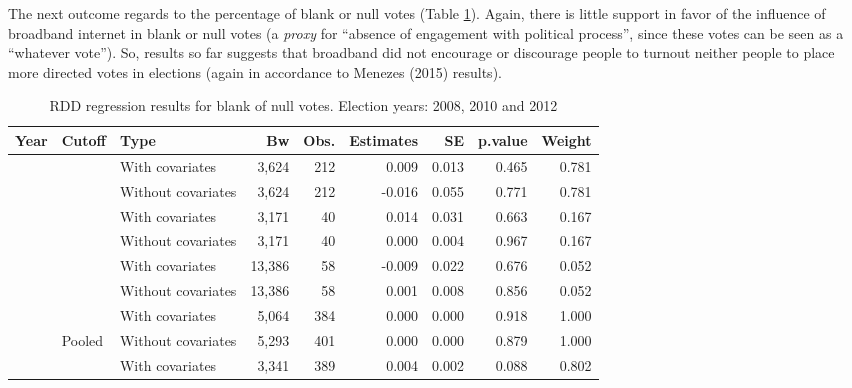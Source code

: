 \documentclass[
  12pt,
]{article}
\begin{document}
The next outcome regards to the percentage of blank or null votes (Table
\ref{tab:r.pct.bn}). Again, there is little support in favor of the
influence of broadband internet in blank or null votes (a \emph{proxy}
for ``absence of engagement with political process'', since these votes
can be seen as a ``whatever vote''). So, results so far suggests that
broadband did not encourage or discourage people to turnout neither
people to place more directed votes in elections (again in accordance to
Menezes (2015) results).

\begin{table}[H]

\caption{\label{tab:r.pct.bn}RDD regression results for blank of null votes. Election years: 2008, 2010 and 2012}
\centering
\begin{tabular}[t]{lllrrrrrr}
\toprule
Year & Cutoff & Type & Bw & Obs. & Estimates & SE & p.value & Weight\\
\midrule
 &  & With covariates & 3,624 & 212 & 0.009 & 0.013 & 0.465 & 0.781\\


 & \multirow{-2}{*}{\raggedright\arraybackslash 20000} & Without covariates & 3,624 & 212 & -0.016 & 0.055 & 0.771 & 0.781\\


 &  & With covariates & 3,171 & 40 & 0.014 & 0.031 & 0.663 & 0.167\\


 & \multirow{-2}{*}{\raggedright\arraybackslash 40000} & Without covariates & 3,171 & 40 & 0.000 & 0.004 & 0.967 & 0.167\\


 &  & With covariates & 13,386 & 58 & -0.009 & 0.022 & 0.676 & 0.052\\


 & \multirow{-2}{*}{\raggedright\arraybackslash 60000} & Without covariates & 13,386 & 58 & 0.001 & 0.008 & 0.856 & 0.052\\


 &  & With covariates & 5,064 & 384 & 0.000 & 0.000 & 0.918 & 1.000\\


\multirow{-8}{*}{\raggedright\arraybackslash 2008} & \multirow{-2}{*}{\raggedright\arraybackslash Pooled} & Without covariates & 5,293 & 401 & 0.000 & 0.000 & 0.879 & 1.000\\

\cmidrule{1-9}
 &  & With covariates & 3,341 & 389 & 0.004 & 0.002 & 0.088 & 0.802\\



\end{tabular}
\end{table}
\end{document}
